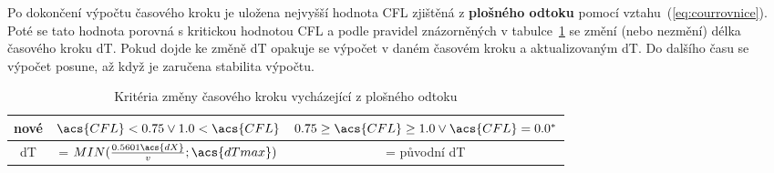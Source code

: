   Po dokončení výpočtu  časového kroku je uložena nejvyšší hodnota \acs{CFL} zjištěná z {\bf plošného odtoku} pomocí vztahu~(\ref{eq:courrovnice}). Poté se tato hodnota porovná s kritickou hodnotou \acs{CFL} a podle pravidel znázorněných v tabulce~\ref{tab:cflsheet} se změní (nebo nezmění) délka časového kroku \acs{dT}. Pokud dojde ke změně \acs{dT} opakuje se výpočet v daném časovém kroku a aktualizovaným \acs{dT}. Do dalšího času se výpočet posune, až když je zaručena stabilita výpočtu. 
  
  \begin{table}[t!]
    \centering
    \caption{Kritéria změny časového kroku vycházející z plošného odtoku}
    \label{tab:cflsheet}
    \begin{tabular}{ccc}
      \hline
        nové  &  $\acs{CFL} < 0.75 \lor 1.0 < \acs{CFL}$ & $ 0.75 \geq \acs{CFL} \geq 1.0 \lor \acs{CFL} = 0.0^*$ \\
        \hline
        \hline
        \acs{dT} &  = $MIN(\frac{0.5601\acs{dX}}{v};\acs{dTmax})$ & = původní \acs{dT}\\
        \hline
    \end{tabular}
  \end{table}

